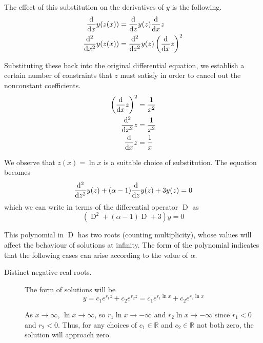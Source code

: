 \documentclass[letterpaper,11pt]{article}
\DeclareMathOperator{\D}{D}
\newcommand{\R}{\mathbb{R}}
\newcommand{\deriv}[1]{{\ensuremath \frac{\mathrm{d}}{\mathrm{d}#1}}}
\newcommand{\nderiv}[2]{{\ensuremath \frac{\mathrm{d}^#1}{\mathrm{d}#2^#1}}}
\begin{document}
\begin{enumerate}
        The effect of this substitution on the derivatives of $y$ is the
        following.
        \begin{align*}
            \deriv{x} y(z(x)) &=
                \deriv{z} y(z) \deriv{x} z \\
            \nderiv{2}{x} y(z(x)) &=
                \nderiv{2}{z} y(z) \left(\deriv{x} z\right)^2
        \end{align*}

        Substituting these back into the original differential equation, we
        establish a certain number of constraints that $z$ must satisfy in
        order to cancel out the nonconstant coefficients.
        \begin{align*}
            \left(\deriv{x} z\right)^2 &= \frac{1}{x^2} \\
            \nderiv{2}{x} z &= \frac{1}{x^2} \\
            \deriv{x} z &= \frac{1}{x}
        \end{align*}

        We observe that $z(x) = \ln x$ is a suitable choice of substitution.
        The equation becomes
        $$ \nderiv{2}{z} y(z) + (\alpha - 1) \deriv{z} y(z) + 3 y(z) = 0 $$
        which we can write in terms of the differential operator $\D{}$ as
        $$ \left( \D^2{} + (\alpha - 1) \D{} + 3 \right)y = 0 $$

        This polynomial in $\D{}$ has two roots (counting multiplicity), whose
        values will affect the behaviour of solutions at infinity. The form of
        the polynomial indicates that the following cases can arise according
        to the value of $\alpha$.

        \begin{description}
            \item[Distinct negative real roots.]

                The form of solutions will be
                \begin{equation*}
                    y = c_1 e^{r_1 z} + c_2 e^{r_2 z}
                    = c_1 e^{r_1 \ln x} + c_2 e^{r_2 \ln x}
                \end{equation*}

                As $x \to \infty$, $\ln x \to \infty$, so
                $r_1 \ln x \to - \infty$ and $r_2 \ln x \to -\infty$ since
                $r_1 < 0$ and $r_2 < 0$. Thus, for any choices of $c_1 \in \R$
                and $c_2 \in \R$ not both zero, the solution will approach
                zero.


\end{description}
\end{enumerate}
\end{document}
